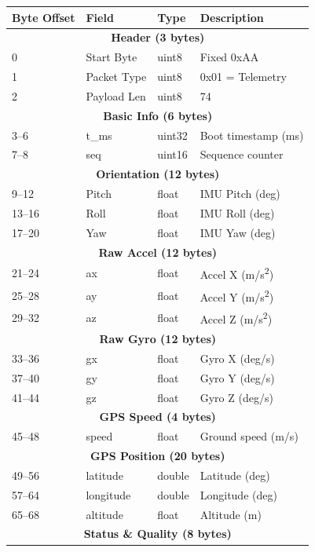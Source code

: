 \documentclass[11pt,a4paper]{article}
\begin{document}
\begin{table}[H]
\centering
\begin{tabular}{@{}llll@{}}
\toprule
\textbf{Byte Offset} & \textbf{Field} & \textbf{Type} & \textbf{Description} \\
\midrule
\multicolumn{4}{c}{\textbf{Header (3 bytes)}} \\
\midrule
0 & Start Byte & uint8 & Fixed 0xAA \\
1 & Packet Type & uint8 & 0x01 = Telemetry \\
2 & Payload Len & uint8 & 74 \\
\midrule
\multicolumn{4}{c}{\textbf{Basic Info (6 bytes)}} \\
\midrule
3--6 & t\_ms & uint32 & Boot timestamp (ms) \\
7--8 & seq & uint16 & Sequence counter \\
\midrule
\multicolumn{4}{c}{\textbf{Orientation (12 bytes)}} \\
\midrule
9--12 & Pitch & float & IMU Pitch (deg) \\
13--16 & Roll & float & IMU Roll (deg) \\
17--20 & Yaw & float & IMU Yaw (deg) \\
\midrule
\multicolumn{4}{c}{\textbf{Raw Accel (12 bytes)}} \\
\midrule
21--24 & ax & float & Accel X (m/s\textsuperscript{2}) \\
25--28 & ay & float & Accel Y (m/s\textsuperscript{2}) \\
29--32 & az & float & Accel Z (m/s\textsuperscript{2}) \\
\midrule
\multicolumn{4}{c}{\textbf{Raw Gyro (12 bytes)}} \\
\midrule
33--36 & gx & float & Gyro X (deg/s) \\
37--40 & gy & float & Gyro Y (deg/s) \\
41--44 & gz & float & Gyro Z (deg/s) \\
\midrule
\multicolumn{4}{c}{\textbf{GPS Speed (4 bytes)}} \\
\midrule
45--48 & speed & float & Ground speed (m/s) \\
\midrule
\multicolumn{4}{c}{\textbf{GPS Position (20 bytes)}} \\
\midrule
49--56 & latitude & double & Latitude (deg) \\
57--64 & longitude & double & Longitude (deg) \\
65--68 & altitude & float & Altitude (m) \\
\midrule
\multicolumn{4}{c}{\textbf{Status \& Quality (8 bytes)}} \\

\end{tabular}
\end{table}
\end{document}

